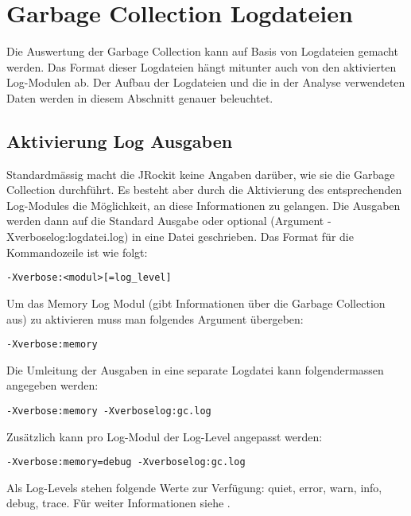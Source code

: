\section{Garbage Collection Logdateien}\label{jrockitgclog}
Die Auswertung der Garbage Collection kann auf Basis von Logdateien gemacht werden. Das Format dieser Logdateien hängt mitunter auch von den aktivierten Log-Modulen ab. Der Aufbau der Logdateien und die in der Analyse verwendeten Daten werden in diesem Abschnitt genauer beleuchtet.

\subsection{Aktivierung Log Ausgaben}
Standardmässig macht die JRockit keine Angaben darüber, wie sie die Garbage Collection durchführt. Es besteht aber durch die Aktivierung des entsprechenden Log-Modules die Möglichkeit, an diese Informationen zu gelangen. Die Ausgaben werden dann auf die Standard Ausgabe oder optional (Argument -Xverboselog:logdatei.log) in eine Datei geschrieben. Das Format für die Kommandozeile ist wie folgt:

\begin{lstlisting}[caption=Format Aktivierung Log Modul]
-Xverbose:<modul>[=log_level]
\end{lstlisting}

Um das Memory Log Modul (gibt Informationen über die Garbage Collection aus) zu aktivieren muss man folgendes Argument übergeben:
\begin{lstlisting}[caption=Garbage Collection Log (Info)]
-Xverbose:memory
\end{lstlisting}

Die Umleitung der Ausgaben in eine separate Logdatei kann folgendermassen angegeben werden:
\begin{lstlisting}[caption=Garbage Collection Log (Info) - Umleitung in gc.log]
-Xverbose:memory -Xverboselog:gc.log 
\end{lstlisting}


Zusätzlich kann pro Log-Modul der Log-Level angepasst werden:
\begin{lstlisting}[caption=Einstellung des Log-Levels]
-Xverbose:memory=debug -Xverboselog:gc.log 
\end{lstlisting}
Als Log-Levels stehen folgende Werte zur Verfügung: quiet, error, warn, info, debug, trace. Für weiter Informationen siehe \cite{oracleJRockitR28CLR}.

